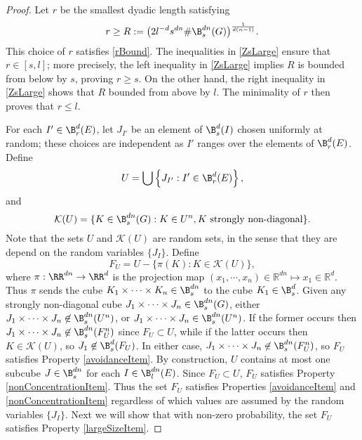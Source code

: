 \begin{proof}
Let $r$ be the smallest dyadic length satisfying 
\begin{equation} \label{What-is-r}
r\geq R := \big(2 l^{-d}s^{dn}\# \B^{dn}_s(G)\big)^{\frac{1}{d(n-1)}}.
\end{equation} 
This choice of $r$ satisfies \eqref{rBound}. 
	The inequalities in \eqref{ZsLarge} ensure that $r \in [s,l]$; more precisely, the left inequality in \eqref{ZsLarge} implies $R$ is bounded from below by $s$, proving $r \geq s$. On the other hand, the right inequality in \eqref{ZsLarge} shows that $R$ bounded from above by $l$. The minimality of $r$ then proves that $r \leq l$.  

	For each $I' \in \B_r^d(E)$, let $J_{I'}$ be an element of $\B^d_s(I)$ chosen uniformly at random; these choices are independent as $I'$ ranges over the elements of $\B_r^d(E)$. Define
	\[ 	U = \bigcup \left\{ J_{I'} :  I' \in \B_r^d(E) \right\}, \]
	and
	\[ \mathcal{K}(U) = \{ K \in \B^{dn}_s(G) : K \in U^n, \text{$K$ strongly non-diagonal} \}. \]
	Note that the sets $U$ and $\mathcal{K}(U)$ are random sets, in the sense that they are depend on the random variables $\{J_I\}$. 
	Define
	\begin{equation} \label{defnOfF}
		F_U = U - \{ \pi(K): K \in \mathcal{K}(U) \},
	\end{equation}
	where $\pi: \RR^{dn} \to \RR^d$ is the projection map $(x_1, \cdots, x_n) \in \mathbb R^{dn} \mapsto x_1 \in \mathbb R^d$. Thus $\pi$ sends the cube $K_1 \times \dots \times K_n\in \B^{dn}_s$ to the cube $K_1\in \B^{d}_s$. Given any strongly non-diagonal cube $J_1 \times \cdots \times J_n \in \B_s^{dn}(G)$, either $J_1 \times \cdots \times J_n \not \in \B_s^{dn}(U^n)$, or $J_1 \times \cdots \times J_n \in \B_s^{dn}(U^n)$. If the former occurs then $J_1 \times \cdots \times J_n \not \in \B_s^{dn}(F_U^n)$ since $F_U \subset U$, while if the latter occurs then $K \in \mathcal{K}(U)$, so $J_1 \not \in \B_s^d(F_U)$. In either case, $J_1 \times \cdots \times J_n \not \in \B_s^{dn}(F_U^n)$, so $F_U$ satisfies Property \ref{avoidanceItem}. By construction, $U$ contains at most one subcube $J \in \B^{dn}_s$ for each $I \in \B^{dn}_l(E)$. Since $F_U \subset U$, $F_U$ satisfies Property \ref{nonConcentrationItem}. Thus the set $F_U$ satisfies Properties \ref{avoidanceItem} and \ref{nonConcentrationItem} regardless of which values are assumed by the random variables $\{J_I\}$. Next we will show that with non-zero probability, the set $F_U$ satisfies Property \ref{largeSizeItem}. 


\end{proof}
